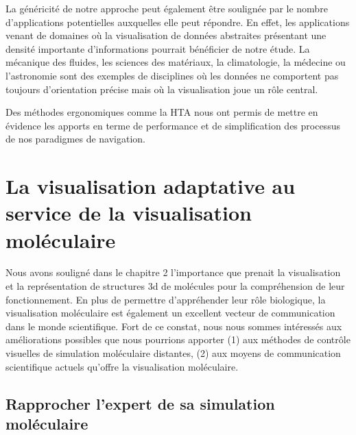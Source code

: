 La généricité de notre approche peut également être soulignée par le nombre d'applications potentielles auxquelles elle peut répondre. En effet, les applications venant de domaines où la visualisation de données abstraites présentant une densité importante d'informations pourrait bénéficier de notre étude. La mécanique des fluides, les sciences des matériaux, la climatologie, la médecine ou l'astronomie sont des exemples de disciplines où les données ne comportent pas toujours d'orientation précise mais où la visualisation joue un rôle central.

Des méthodes ergonomiques comme la HTA nous ont permis de mettre en évidence les apports en terme de performance et de simplification des processus de nos paradigmes de navigation. 


\section{La visualisation adaptative au service de la visualisation moléculaire}

Nous avons souligné dans le chapitre 2 l'importance que prenait la visualisation et la représentation de structures 3d de molécules pour la compréhension de leur fonctionnement. En plus de permettre d'appréhender leur rôle biologique, la visualisation moléculaire est également un excellent vecteur de communication dans le monde scientifique. Fort de ce constat, nous nous sommes intéressés aux améliorations possibles que nous pourrions apporter (1) aux méthodes de contrôle visuelles de simulation moléculaire distantes, (2) aux moyens de communication scientifique actuels qu'offre la visualisation moléculaire. %


\subsection{Rapprocher l'expert de sa simulation moléculaire}


